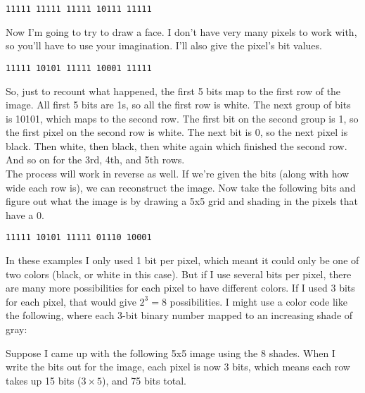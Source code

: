 \begin{center}\end{center}

\begin{verbatim}
11111 11111 11111 10111 11111
\end{verbatim}

Now I'm going to try to draw a face. I don't have very many pixels to work with, so you'll have to use your imagination. I'll also give the pixel's bit values.

\begin{center}\end{center}

\begin{verbatim}
11111 10101 11111 10001 11111
\end{verbatim}

So, just to recount what happened, the first 5 bits map to the first row of the image. All first 5 bits are 1s, so all the first row is white. The next group of bits is 10101, which maps to the second row. The first bit on the second group is 1, so the first pixel on the second row is white. The next bit is 0, so the next pixel is black. Then white, then black, then white again which finished the second row. And so on for the 3rd, 4th, and 5th rows.\\

The process will work in reverse as well. If we're given the bits (along with how wide each row is), we can reconstruct the image. Now take the following bits and figure out what the image is by drawing a 5x5 grid and shading in the pixels that have a 0.

\begin{verbatim}
11111 10101 11111 01110 10001
\end{verbatim}

In these examples I only used 1 bit per pixel, which meant it could only be one of two colors (black, or white in this case). But if I use several bits per pixel, there are many more possibilities for each pixel to have different colors. If I used 3 bits for each pixel, that would give \(2^3 = 8\) possibilities. I might use a color code like the following, where each 3-bit binary number mapped to an increasing shade of gray:

\begin{center}\end{center}

Suppose I came up with the following 5x5 image using the 8 shades. When I write the bits out for the image, each pixel is now 3 bits, which means each row takes up 15 bits (\(3\times5\)), and 75 bits total.

